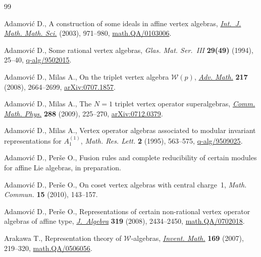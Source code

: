 \documentclass[pdftex]{sigma}
\begin{document}
\begin{thebibliography}{99}
\footnotesize\itemsep=0pt

Adamovi{\'c} D., A construction of some ideals in af\/f\/ine vertex algebras,
  \href{http://dx.doi.org/10.1155/S0161171203201058}{\textit{Int.~J. Math. Math. Sci.}}  (2003), 971--980,
  \href{http://arxiv.org/abs/math.QA/0103006}{math.QA/0103006}.

Adamovi{\'c} D., Some rational vertex algebras, \textit{Glas. Mat. Ser.~III}
  \textbf{29(49)} (1994), 25--40, \href{http://arxiv.org/abs/q-alg/9502015}{q-alg/9502015}.

Adamovi{\'c} D., Milas A., On the triplet vertex algebra {${\mathcal W}(p)$},
  \href{http://dx.doi.org/10.1016/j.aim.2007.11.012}{\textit{Adv. Math.}} \textbf{217} (2008), 2664--2699, \href{http://arxiv.org/abs/0707.1857}{arXiv:0707.1857}.


Adamovi{\'c} D., Milas A., The {$N=1$} triplet vertex operator superalgebras,
  \href{http://dx.doi.org/10.1007/s00220-009-0735-2}{\textit{Comm. Math. Phys.}} \textbf{288} (2009), 225--270, \href{http://arxiv.org/abs/0712.0379}{arXiv:0712.0379}.

Adamovi{\'c} D., Milas A., Vertex operator algebras associated to modular
  invariant representations for {$A^{(1)}_1$}, \textit{Math. Res. Lett.}
  \textbf{2} (1995), 563--575, \href{http://arxiv.org/abs/q-alg/9509025}{q-alg/9509025}.

Adamovi{\'c} D., Per{\v{s}}e O., Fusion rules and complete reducibility of
  certain modules for af\/f\/ine Lie algebras, in preparation.

Adamovi{\'c} D., Per{\v{s}}e O., On coset vertex algebras with central charge~1, \textit{Math. Commun.} \textbf{15} (2010), 143--157.

Adamovi{\'c} D., Per{\v{s}}e O., Representations of certain non-rational vertex
  operator algebras of af\/f\/ine type, \href{http://dx.doi.org/10.1016/j.jalgebra.2008.01.003}{\textit{J.~Algebra}} \textbf{319} (2008),
  2434--2450, \href{http://arxiv.org/abs/math.QA/0702018}{math.QA/0702018}.



Arakawa T., Representation theory of {${\mathcal W}$}-algebras, \href{http://dx.doi.org/10.1007/s00222-007-0046-1}{\textit{Invent.
  Math.}} \textbf{169} (2007), 219--320, \href{http://arxiv.org/abs/math.QA/0506056}{math.QA/0506056}.


\end{thebibliography}
\end{document}
